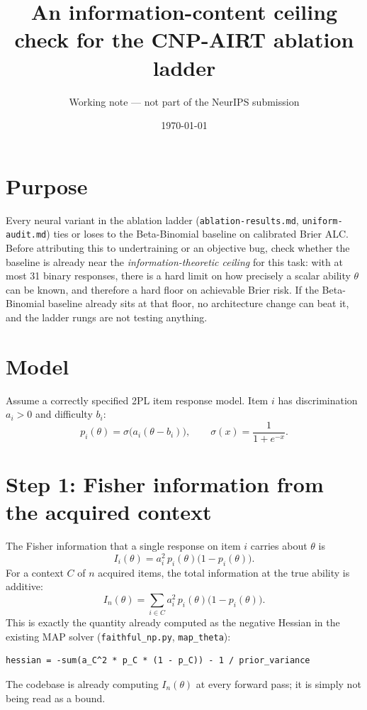 \documentclass[11pt]{article}
\title{An information-content ceiling check for the CNP-AIRT ablation ladder}
\author{Working note --- not part of the NeurIPS submission}
\date{\today}
\begin{document}
\maketitle

\section{Purpose}

Every neural variant in the ablation ladder (\texttt{ablation-results.md},
\texttt{uniform-audit.md}) ties or loses to the Beta-Binomial baseline on
calibrated Brier ALC. Before attributing this to undertraining or an
objective bug, check whether the baseline is already near the
\emph{information-theoretic ceiling} for this task: with at most 31 binary
responses, there is a hard limit on how precisely a scalar ability
$\theta$ can be known, and therefore a hard floor on achievable Brier risk.
If the Beta-Binomial baseline already sits at that floor, no architecture
change can beat it, and the ladder rungs are not testing anything.

\section{Model}

Assume a correctly specified 2PL item response model. Item $i$ has
discrimination $a_i > 0$ and difficulty $b_i$:
\begin{equation}
  p_i(\theta) = \sigma\!\big(a_i(\theta - b_i)\big), \qquad
  \sigma(x) = \frac{1}{1+e^{-x}}.
\end{equation}

\section{Step 1: Fisher information from the acquired context}

The Fisher information that a single response on item $i$ carries about
$\theta$ is
\begin{equation}
  I_i(\theta) = a_i^2\, p_i(\theta)\big(1 - p_i(\theta)\big).
\end{equation}
For a context $C$ of $n$ acquired items, the total information at the true
ability is additive:
\begin{equation}
  I_n(\theta) = \sum_{i \in C} a_i^2\, p_i(\theta)\big(1 - p_i(\theta)\big).
\end{equation}
This is exactly the quantity already computed as the negative Hessian in
the existing MAP solver (\texttt{faithful\_np.py}, \texttt{map\_theta}):
\begin{verbatim}
hessian = -sum(a_C^2 * p_C * (1 - p_C)) - 1 / prior_variance
\end{verbatim}
The codebase is already computing $I_n(\theta)$ at every forward pass; it is
simply not being read as a bound.
\end{document}
